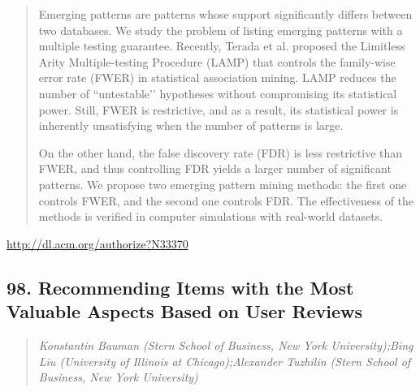\documentclass{article}
\begin{document}
\begin{quote}
Emerging patterns are patterns whose support significantly differs between two databases. We study the problem of listing emerging patterns with a multiple testing guarantee. Recently, Terada et al. proposed the Limitless Arity Multiple-testing Procedure (LAMP) that controls the family-wise error rate (FWER) in statistical association mining. LAMP reduces the number of ``untestable’’ hypotheses without compromising its statistical power. Still, FWER is restrictive, and as a result, its statistical power is inherently unsatisfying when the number of patterns is large. 







 On the other hand, the false discovery rate (FDR) is less restrictive than FWER, and thus controlling FDR yields a larger number of significant patterns. We propose two emerging pattern mining methods: the first one controls FWER, and the second one controls FDR. The effectiveness of the methods is verified in computer simulations with real-world datasets.
\end{quote}

\href{http://dl.acm.org/authorize?N33370}{http://dl.acm.org/authorize?N33370}

\subsection{98. Recommending Items with the Most Valuable Aspects Based on User Reviews}

\begin{quote}
\footnotesize{\textit{Konstantin Bauman (Stern School of Business, New York University);Bing Liu (University of Illinois at Chicago);Alexander Tuzhilin (Stern School of Business, New York University)}}

\end{quote}
\end{document}
